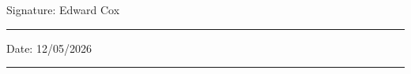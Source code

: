 \documentclass[12pt,oneside]{book}
\begin{document}
\noindent Signature: Edward Cox\\[1mm]
\rule[1em]{25em}{0.5pt}

\noindent Date: 12/05/2026\\[1mm]
\rule[1em]{25em}{0.5pt}








\tableofcontents
\listoffigures
\listoftables


\glsaddall
\printnoidxglossary[type=\acronymtype]
\printnoidxglossary

\mainmatter













\begin{appendices}


\end{appendices}
\end{document}
